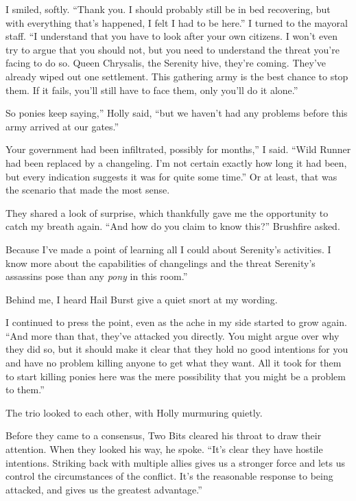 I smiled, softly. “Thank you. I should probably still be in bed recovering, but with everything that’s happened, I felt I had to be here.” I turned to the mayoral staff. “I understand that you have to look after your own citizens. I won’t even try to argue that you should not, but you need to understand the threat you’re facing to do so. Queen Chrysalis, the Serenity hive, they’re coming. They’ve already wiped out one settlement. This gathering army is the best chance to stop them. If it fails, you’ll still have to face them, only you’ll do it alone.”

\leavevmode{}So ponies keep saying,” Holly said, “but we haven’t had any problems before this army arrived at our gates.”

\leavevmode{}Your government had been infiltrated, possibly for months,” I said. “Wild Runner had been replaced by a changeling. I’m not certain exactly how long it had been, but every indication suggests it was for quite some time.” Or at least, that was the scenario that made the most sense.

They shared a look of surprise, which thankfully gave me the opportunity to catch my breath again. “And how do you claim to know this?” Brushfire asked.

\leavevmode{}Because I’ve made a point of learning all I could about Serenity’s activities. I know more about the capabilities of changelings and the threat Serenity’s assassins pose than any \textit{pony} in this room.”

Behind me, I heard Hail Burst give a quiet snort at my wording.

I continued to press the point, even as the ache in my side started to grow again. “And more than that, they’ve attacked you directly. You might argue over why they did so, but it should make it clear that they hold no good intentions for you and have no problem killing anyone to get what they want. All it took for them to start killing ponies here was the mere possibility that you might be a problem to them.”

The trio looked to each other, with Holly murmuring quietly.

Before they came to a consensus, Two Bits cleared his throat to draw their attention. When they looked his way, he spoke. “It’s clear they have hostile intentions. Striking back with multiple allies gives us a stronger force and lets us control the circumstances of the conflict. It’s the reasonable response to being attacked, and gives us the greatest advantage.”

